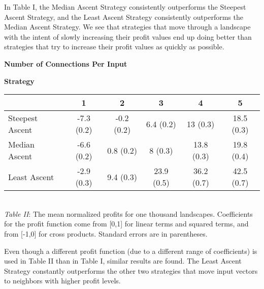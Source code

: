 In Table I, the Median Ascent Strategy consistently outperforms the Steepest Ascent
Strategy, and the Least Ascent Strategy consistently outperforms the
Median Ascent Strategy. We see that strategies that move through a
landscape with the intent of slowly increasing their profit values end
up doing better than strategies that try to increase their profit values
as quickly as possible.

\newpage

\begin{center}
\hspace{2cm} \textbf{Number of Connections Per Input}
\begin{flushleft}
\hspace{2.5cm} \textbf{Strategy}
\end{flushleft}
\begin{Schunk}

\begin{tabular}{l|c|c|c|c|c}
\hline
  & 1 & 2 & 3 & 4 & 5\\
\hline
Steepest Ascent & -7.3 (0.2) & -0.2 (0.2) & 6.4 (0.2) & 13 (0.3) & 18.5 (0.3)\\
\hline
Median Ascent & -6.6 (0.2) & 0.8 (0.2) & 8 (0.3) & 13.8 (0.3) & 19.8 (0.4)\\
\hline
Least Ascent & -2.9 (0.3) & 9.4 (0.3) & 23.9 (0.5) & 36.2 (0.7) & 42.5 (0.7)\\
\hline
\end{tabular}

\end{Schunk}
\\
\emph{Table II}: The mean normalized profits for one thousand landscapes. Coefficients for the profit function come from [0,1] for linear terms and squared terms, and from [-1,0] for cross products. Standard errors are in parentheses.
\end{center}

Even though a different profit function (due to a different range of
coefficients) is used in Table II than in Table I, similar results are
found. The Least Ascent Strategy constantly outperforms the other two
strategies that move input vectors to neighbors with higher profit
levels.

